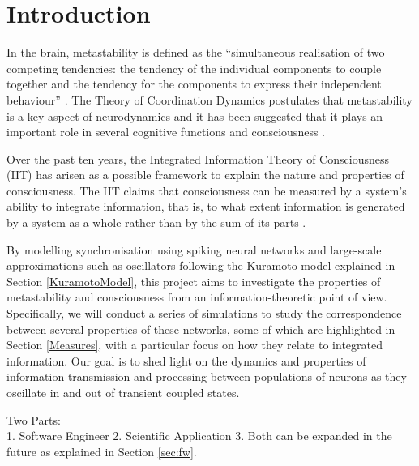 \documentclass[a4paper,11pt]{article}
\begin{document}
\clearpage

\tableofcontents

\clearpage

\section{Introduction}
\label{sec:intro}
In the brain, metastability is defined as the ``simultaneous realisation of two competing tendencies: the tendency of the individual components to couple together and the tendency for the components to express their independent behaviour'' \cite{Kelso2012}. The Theory of Coordination Dynamics postulates that metastability is a key aspect of neurodynamics and it has been suggested that it plays an important role in several cognitive functions and consciousness \cite{Seth2009}. 

Over the past ten years, the Integrated Information Theory of Consciousness (IIT) has arisen as a possible framework to explain the nature and properties of consciousness. The IIT claims that consciousness can be measured by a system's ability to integrate information, that is, to what extent information is generated by a system as a whole rather  than by the sum of its parts \cite{Tononi2003}.

By modelling synchronisation using spiking neural networks and large-scale approximations such as oscillators following the Kuramoto model explained in Section \ref{KuramotoModel}, this project aims to investigate the properties of metastability and consciousness from an information-theoretic point of view. Specifically, we will conduct a series of simulations to study the correspondence between several properties of these networks, some of which are highlighted in Section \ref{Measures}, with a particular focus on how they relate to integrated information. Our goal is to shed light on the dynamics and properties of information transmission and processing between populations of neurons as they oscillate in and out of transient coupled states.

Two Parts:\\
1. Software Engineer
2. Scientific Application
3. Both can be expanded in the future as explained in Section \ref{sec:fw}.

\end{document}
